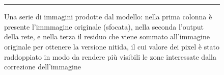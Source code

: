 \documentclass[a4paper,10pt,twocolumn]{article}
\begin{document}
\begin{figure}[t]
\begin{mdframed}[
      linewidth=1pt,
      innertopmargin=6pt,
      innerbottommargin=6pt,
      innerleftmargin=6pt,
      innerrightmargin=6pt
      linecolor=black,
      nobreak
    ]
{    }\hspace{0.1cm}\hfill
    \\ \vspace{0.3cm}
    \hspace{0.1cm}\hfill
    \hspace{0.1cm}\hfill
    \hspace{0.1cm}\hfill
    \\ \vspace{0.3cm}

    \vspace{3pt}
    \hrule
    \vspace{3pt}
    \caption{
      Una serie di immagini prodotte dal modello: nella prima colonna è presente l'immmagine originale (sfocata), nella seconda l'output della rete,
      e nella terza il residuo che viene sommato all'immagine originale per ottenere la versione nitida, 
      il cui valore dei pixel è stato raddoppiato in modo da rendere più visibili le zone interessate dalla correzione dell'immagine
    }
  \end{mdframed}
  \label{foto_esempio}
\end{figure}

\FloatBarrier

\printglossary[title=Glossario, toctitle=Glossario]

\printbibliography
\end{document}

